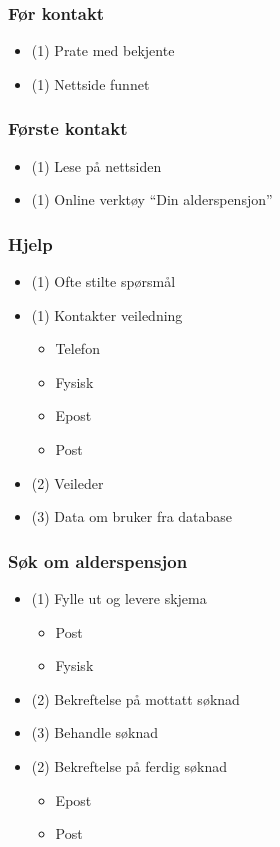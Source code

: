 \documentclass[informationsecurity]{gucmasterproject}
\begin{document}
\subsubsection{Før kontakt}
\begin{itemize}
\item (1) Prate med bekjente
\item (1) Nettside funnet
\end{itemize}

\subsubsection{Første kontakt}
\begin{itemize}
\item (1) Lese på nettsiden
\item (1) Online verktøy “Din alderspensjon”
\end{itemize}

\subsubsection{Hjelp}
\begin{itemize}
\item (1) Ofte stilte spørsmål
\item (1) Kontakter veiledning
	\begin{itemize}
	\item Telefon
	\item Fysisk
	\item Epost
	\item Post
	\end{itemize}
\item (2) Veileder
\item (3) Data om bruker fra database
\end{itemize}

\subsubsection{Søk om alderspensjon}
\begin{itemize}
\item (1) Fylle ut og levere skjema
	\begin{itemize}
	\item Post
	\item Fysisk
	\end{itemize}
\item (2) Bekreftelse på mottatt søknad
\item (3) Behandle søknad
\item (2) Bekreftelse på ferdig søknad
	\begin{itemize}
	\item Epost
	\item Post
	\end{itemize}
\end{itemize}
\end{document}
